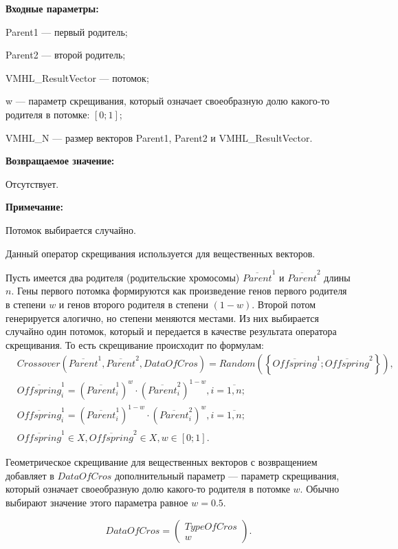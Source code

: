 \textbf{Входные параметры:}
 
Parent1 --- первый родитель;
 
Parent2 --- второй родитель;
 
VMHL\_ResultVector --- потомок;

w --- параметр скрещивания, который означает своеобразную долю какого-то родителя в потомке: $[0;1]$;
 
VMHL\_N --- размер векторов Parent1, Parent2 и VMHL\_ResultVector.

\textbf{Возвращаемое значение:}

 Отсутствует.
 
\textbf{ Примечание:}

 Потомок выбирается случайно.
 
Данный оператор скрещивания используется для вещественных векторов.

Пусть имеется два родителя (родительские хромосомы) $ \overline{Parent}^1 $ и $ \overline{Parent}^2$ длины $n$. Гены первого потомка формируются как произведение генов первого родителя в степени $w$ и генов второго родителя в степени $\left( 1-w\right) $. Второй потом генерируется алогично, но степени меняются местами.  Из них выбирается случайно один потомок, который и передается в качестве результата оператора скрещивания. То есть скрещивание происходит по формулам:
\begin{align}
\label{SetOfOperatorsAlgorithms:eq:GeometricalCrossoverForReal}
&Crossover \left( \overline{Parent}^1, \overline{Parent}^2, DataOfCros\right)=Random \left(\left\lbrace \overline{Offspring}^1; \overline{Offspring}^2\right\rbrace  \right), \\
& \overline{Offspring}^1_i=\left( \overline{Parent}^1_i\right)^w \cdot\left( \overline{Parent}^2_i\right)^{1-w}  , i=\overline{1,n};\nonumber\\
& \overline{Offspring}^1_i=\left( \overline{Parent}^1_i\right)^{1-w} \cdot\left( \overline{Parent}^2_i\right)^w  , i=\overline{1,n};\nonumber\\
&\overline{Offspring}^1\in X, \overline{Offspring}^2\in X, w\in \left[ 0; 1\right] .\nonumber
\end{align}

Геометрическое скрещивание для вещественных векторов с возвращением добавляет в $ DataOfCros $ дополнительный параметр --- параметр скрещивания, который означает своеобразную долю какого-то родителя в потомке $ w $. Обычно выбирают значение этого параметра равное $ w=0.5 $.

\begin{equation}
DataOfCros=\left( \begin{array}{c} TypeOfCros \\ w \end{array} \right).
\end{equation}